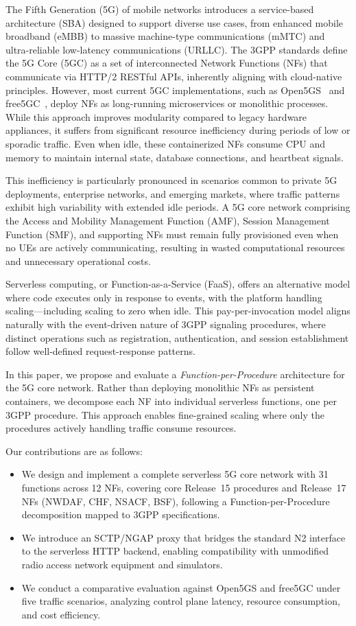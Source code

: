 \documentclass[conference]{IEEEtran}
\begin{document}
The Fifth Generation (5G) of mobile networks introduces a service-based architecture (SBA) designed to support diverse use cases, from enhanced mobile broadband (eMBB) to massive machine-type communications (mMTC) and ultra-reliable low-latency communications (URLLC). The 3GPP standards define the 5G Core (5GC) as a set of interconnected Network Functions (NFs) that communicate via HTTP/2 RESTful APIs, inherently aligning with cloud-native principles. However, most current 5GC implementations, such as Open5GS~\cite{open5gs} and free5GC~\cite{free5gc}, deploy NFs as long-running microservices or monolithic processes. While this approach improves modularity compared to legacy hardware appliances, it suffers from significant resource inefficiency during periods of low or sporadic traffic. Even when idle, these containerized NFs consume CPU and memory to maintain internal state, database connections, and heartbeat signals.

This inefficiency is particularly pronounced in scenarios common to private 5G deployments, enterprise networks, and emerging markets, where traffic patterns exhibit high variability with extended idle periods. A 5G core network comprising the Access and Mobility Management Function (AMF), Session Management Function (SMF), and supporting NFs must remain fully provisioned even when no UEs are actively communicating, resulting in wasted computational resources and unnecessary operational costs.

Serverless computing, or Function-as-a-Service (FaaS), offers an alternative model where code executes only in response to events, with the platform handling scaling---including scaling to zero when idle. This pay-per-invocation model aligns naturally with the event-driven nature of 3GPP signaling procedures, where distinct operations such as registration, authentication, and session establishment follow well-defined request-response patterns.

In this paper, we propose and evaluate a \textit{Function-per-Procedure} architecture for the 5G core network. Rather than deploying monolithic NFs as persistent containers, we decompose each NF into individual serverless functions, one per 3GPP procedure. This approach enables fine-grained scaling where only the procedures actively handling traffic consume resources.

Our contributions are as follows:
\begin{itemize}
    \item We design and implement a complete serverless 5G core network with 31 functions across 12 NFs, covering core Release~15 procedures and Release~17 NFs (NWDAF, CHF, NSACF, BSF), following a Function-per-Procedure decomposition mapped to 3GPP specifications.
    \item We introduce an SCTP/NGAP proxy that bridges the standard N2 interface to the serverless HTTP backend, enabling compatibility with unmodified radio access network equipment and simulators.
    \item We conduct a comparative evaluation against Open5GS and free5GC under five traffic scenarios, analyzing control plane latency, resource consumption, and cost efficiency.
\end{itemize}
\end{document}
